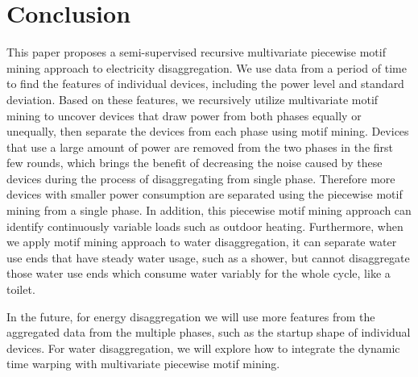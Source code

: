 \section{Conclusion}
This paper proposes a semi-supervised recursive multivariate piecewise motif mining approach 
to electricity disaggregation. 
We use data from a period of time to find the features of individual devices, 
including the power level and standard deviation.
Based on these features, 
we recursively utilize multivariate motif mining to uncover devices 
that draw power from both phases equally or unequally, 
then separate the devices from each phase using motif mining. 
Devices that use a large amount of power are removed from the two phases in the first few rounds, 
which brings the benefit of decreasing the noise caused by these devices 
during the process of disaggregating from single phase. 
Therefore more devices with smaller power consumption are separated 
using the piecewise motif mining from a single phase. 
In addition, this piecewise motif mining approach can identify
continuously variable loads such as outdoor heating. 
Furthermore, when we apply motif mining approach to water disaggregation, 
it can separate water use ends that have steady water usage, such as a shower, 
but cannot disaggregate those water use ends which consume water variably for the whole 
cycle, like a toilet. 

In the future, 
for energy disaggregation we will use more features from the aggregated data from the multiple phases, 
such as the startup shape of individual devices.
For water disaggregation, we will explore how to integrate the 
dynamic time warping with multivariate piecewise motif mining. 
